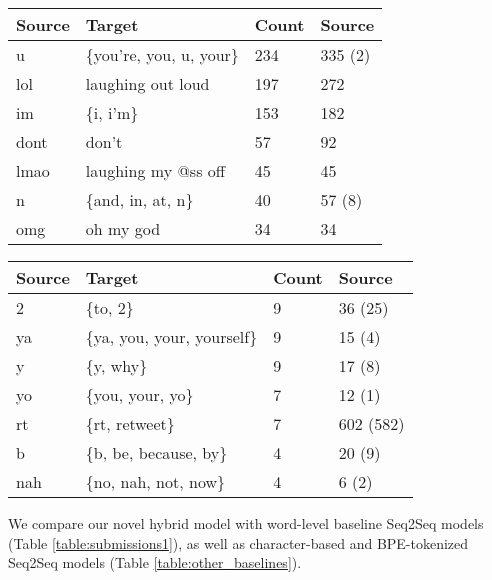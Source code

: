 \documentclass[letterpaper]{article} \usepackage{aaai19}  \usepackage{times}  \usepackage{helvet} \usepackage{courier}  \usepackage[hyphens]{url}  \usepackage{graphicx} \urlstyle{rm} \def\UrlFont{\rm}  \usepackage{graphicx}  \frenchspacing  \setlength{\pdfpagewidth}{8.5in}  \setlength{\pdfpageheight}{11in}
\begin{document}
\begin{table*}[ht!]
\centering
\begin{minipage}{0.49\textwidth}
\begin{tabular}{|l|l|l|l|}
\hline
Source & Target & Count &Source \\ \hline
u & \{you're, you, u, your\} & 234 & 335 (2) \\
lol & laughing out loud & 197 & 272\\
im & \{i, i'm\} & 153 & 182\\
dont & don't & 57 & 92\\
lmao & laughing my @ss off & 45 & 45\\
n & \{and, in, at, n\} & 40 & 57 (8) \\
omg & oh my god & 34 & 34 \\ \hline


\end{tabular}
\end{minipage}
\begin{minipage}{0.49\textwidth}
\begin{tabular}{|l|l|l|l|}
\hline
Source & Target & Count & Source \\ \hline
2 & \{to, 2\} & 9 & 36 (25)\\ 
ya & \{ya, you, your, yourself\} & 9 & 15 (4) \\
y &  \{y, why\} & 9 & 17 (8) \\
yo &  \{you, your, yo\} & 7 & 12 (1)\\
rt & \{rt, retweet\} & 7 & 602 (582) \\ 
b &  \{b, be, because, by\} & 4 & 20 (9) \\
nah & \{no, nah, not, now\} & 4 & 6 (2) \\
\hline
\end{tabular}
\end{minipage}


\caption{Most frequent correct (\textit{left table}) and incorrect (\textit{right table}) normalizations of our word-level Seq2Seq model. We present how many times a source tweet was (in)correctly normalized (Count column) as well as how many times that term appears in the source-side of the examples (Source). For cases where a token can be normalized to itself, we include how many times that term appears unchanged (information in parentheses)}
  \label{table:examples}
\end{table*}
We compare our novel hybrid model with word-level baseline  Seq2Seq models (Table \ref{table:submissions1}), as well as character-based and BPE-tokenized Seq2Seq models (Table \ref{table:other_baselines}).
\end{document}
